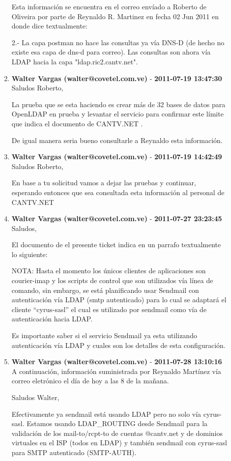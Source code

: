 \begin{description}
\begin{enumerate}
Esta información se encuentra en el correo envíado a Roberto de Oliveira por
parte de Reynaldo R. Martinez en fecha 02 Jun 2011 en donde dice textualmente:

 2.- La capa postman no hace las consultas ya vía DNS-D (de hecho no
 existe esa capa de dns-d para correo). Las consultas son ahora vía LDAP
 hacia la capa "ldap.ric2.cantv.net".        \item {\bfseries Walter Vargas (walter@covetel.com.ve)  } - {\bfseries 2011-07-19 13:47:30} \\ Saludos Roberto,  

La prueba que se esta haciendo es crear más de 32 bases de datos para OpenLDAP
en prueba y levantar el servicio para confirmar este límite que indica el
documento de CANTV.NET . 

De igual manera seria bueno consultarle a Reynaldo esta información.         \item {\bfseries Walter Vargas (walter@covetel.com.ve)  } - {\bfseries 2011-07-19 14:42:49} \\ Saludos Roberto,  

En base a tu solicitud vamos a dejar las pruebas y continuar, esperando
entonces que sea consultada esta información al personal de CANTV.NET        \item {\bfseries Walter Vargas (walter@covetel.com.ve)  } - {\bfseries 2011-07-27 23:23:45} \\ Saludos,

El documento de el presente ticket indica en un parrafo textualmente lo
siguiente: 

 NOTA: Hasta el momento los únicos clientes de aplicaciones son courier-imap y
 los scripts de control que son utilizados vía línea de comando, sin embargo,
 se está planificando usar Sendmail con autenticación vía LDAP (smtp
 autenticado) para lo cual se adaptará el cliente “cyrus-sasl” el cual es
 utilizado por sendmail como vía de autenticación hacia LDAP.

Es importante saber si el servicio Sendmail ya esta utilizando autenticación
vía LDAP y cuales son los detalles de esta configuración.         \item {\bfseries Walter Vargas (walter@covetel.com.ve)  } - {\bfseries 2011-07-28 13:10:16} \\ A continuación, información suministrada por Reynaldo Martínez vía correo
eletrónico el día de hoy a las 8 de la mañana. 

 Saludos Walter, 
 
 Efectivamente ya sendmail está usando LDAP pero no solo vía cyrus-sasl. Estamos
 usando LDAP_ROUTING desde Sendmail para la validación de los mail-to/rcpt-to de
 cuentas @cantv.net y de dominios virtuales en el ISP (todos en LDAP) y también
 sendmail con cyrus-sasl para SMTP autenticado (SMTP-AUTH).
 

\end{enumerate}
\end{description}
